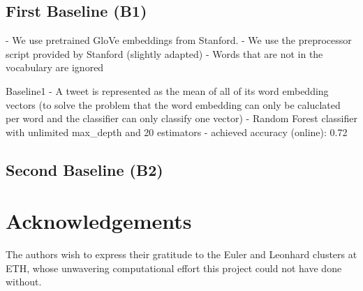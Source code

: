 \documentclass[10pt,conference,compsocconf]{IEEEtran}
\begin{document}
\subsection{First Baseline (B1)}



- We use pretrained GloVe \cite{glove} embeddings from Stanford.
- We use the preprocessor script provided by Stanford (slightly adapted)
- Words that are not in the vocabulary are ignored

Baseline1
- A tweet is represented as the mean of all of its word embedding vectors (to solve the problem that the word embedding can only be caluclated per word and the classifier can only classify one vector)
- Random Forest classifier with unlimited max\_depth and 20 estimators
- achieved accuracy (online): 0.72


\subsection{Second Baseline (B2)}

\section*{Acknowledgements}
The authors wish to express their gratitude to the Euler and Leonhard
clusters at ETH, whose unwavering computational effort this project
could not have done without.



\end{document}
